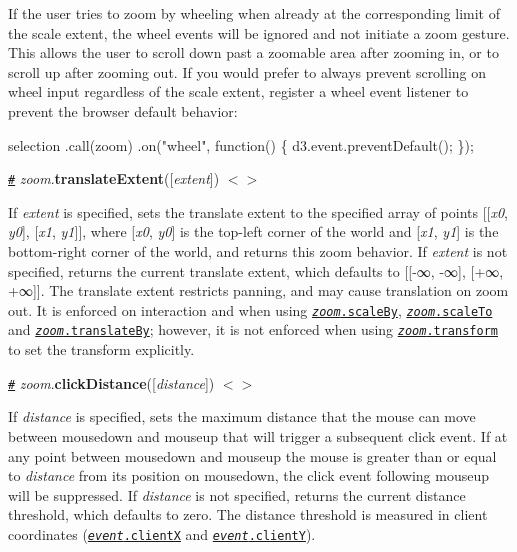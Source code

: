 If the user tries to zoom by wheeling when already at the corresponding limit of the scale extent, the wheel events will be ignored and not initiate a zoom gesture. This allows the user to scroll down past a zoomable area after zooming in, or to scroll up after zooming out. If you would prefer to always prevent scrolling on wheel input regardless of the scale extent, register a wheel event listener to prevent the browser default behavior\+:


\begin{DoxyCode}
selection
    .call(zoom)
    .on("wheel", function() \{ d3.event.preventDefault(); \});
\end{DoxyCode}


\href{#zoom_translateExtent}{\tt \#} {\itshape zoom}.{\bfseries translate\+Extent}(\mbox{[}{\itshape extent}\mbox{]}) \href{https://github.com/d3/d3-zoom/blob/master/src/zoom.js#L402}{\tt $<$$>$}

If {\itshape extent} is specified, sets the translate extent to the specified array of points \mbox{[}\mbox{[}{\itshape x0}, {\itshape y0}\mbox{]}, \mbox{[}{\itshape x1}, {\itshape y1}\mbox{]}\mbox{]}, where \mbox{[}{\itshape x0}, {\itshape y0}\mbox{]} is the top-\/left corner of the world and \mbox{[}{\itshape x1}, {\itshape y1}\mbox{]} is the bottom-\/right corner of the world, and returns this zoom behavior. If {\itshape extent} is not specified, returns the current translate extent, which defaults to \mbox{[}\mbox{[}-\/∞, -\/∞\mbox{]}, \mbox{[}+∞, +∞\mbox{]}\mbox{]}. The translate extent restricts panning, and may cause translation on zoom out. It is enforced on interaction and when using \href{#zoom_scaleBy}{\tt {\itshape zoom}.scale\+By}, \href{#zoom_scaleTo}{\tt {\itshape zoom}.scale\+To} and \href{#zoom_translateBy}{\tt {\itshape zoom}.translate\+By}; however, it is not enforced when using \href{#zoom_transform}{\tt {\itshape zoom}.transform} to set the transform explicitly.

\href{#zoom_clickDistance}{\tt \#} {\itshape zoom}.{\bfseries click\+Distance}(\mbox{[}{\itshape distance}\mbox{]}) \href{https://github.com/d3/d3-zoom/blob/master/src/zoom.js#L419}{\tt $<$$>$}

If {\itshape distance} is specified, sets the maximum distance that the mouse can move between mousedown and mouseup that will trigger a subsequent click event. If at any point between mousedown and mouseup the mouse is greater than or equal to {\itshape distance} from its position on mousedown, the click event following mouseup will be suppressed. If {\itshape distance} is not specified, returns the current distance threshold, which defaults to zero. The distance threshold is measured in client coordinates (\href{https://developer.mozilla.org/en-US/docs/Web/API/MouseEvent/clientX}{\tt {\itshape event}.clientX} and \href{https://developer.mozilla.org/en-US/docs/Web/API/MouseEvent/clientY}{\tt {\itshape event}.clientY}).

